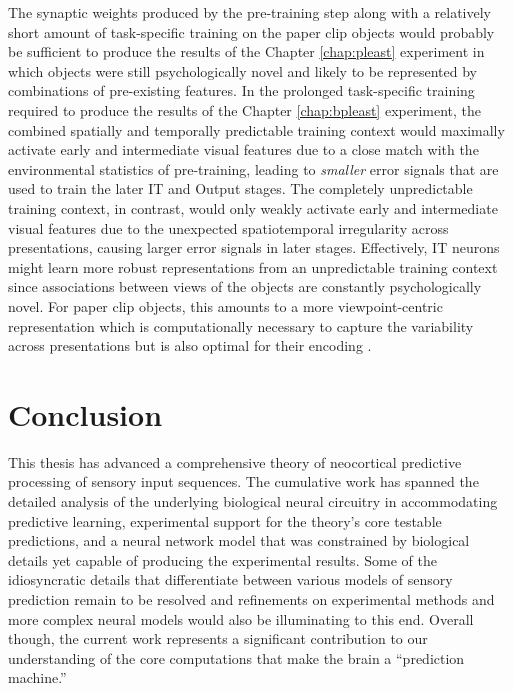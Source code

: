 \documentclass[dwyatte_dissertation.tex]{subfiles}
\begin{document}
The synaptic weights produced by the pre-training step along with a relatively short amount of task-specific training on the paper clip objects would probably be sufficient to produce the results of the Chapter \ref{chap:pleast} experiment in which objects were still psychologically novel and likely to be represented by combinations of pre-existing features. In the prolonged task-specific training required to produce the results of the Chapter \ref{chap:bpleast} experiment, the combined spatially and temporally predictable training context would maximally activate early and intermediate visual features due to a close match with the environmental statistics of pre-training, leading to \textit{smaller} error signals that are used to train the later IT and Output stages. The completely unpredictable training context, in contrast, would only weakly activate early and intermediate visual features due to the unexpected spatiotemporal irregularity across presentations, causing larger error signals in later stages. Effectively, IT neurons might learn more robust representations from an unpredictable training context since associations between views of the objects are constantly psychologically novel. For paper clip objects, this amounts to a more viewpoint-centric representation which is computationally necessary to capture the variability across presentations but is also optimal for their encoding \cite{FarahRochlinKlen94}. 


\section{Conclusion}
This thesis has advanced a comprehensive theory of neocortical predictive processing of sensory input sequences. The cumulative work has spanned the detailed analysis of the underlying biological neural circuitry in accommodating predictive learning, experimental support for the theory's core testable predictions, and a neural network model that was constrained by biological details yet capable of producing the experimental results. Some of the idiosyncratic details that differentiate between various models of sensory prediction remain to be resolved and refinements on experimental methods and more complex neural models would also be illuminating to this end. Overall though, the current work represents a significant contribution to our understanding of the core computations that make the brain a ``prediction machine.''



\end{document}
